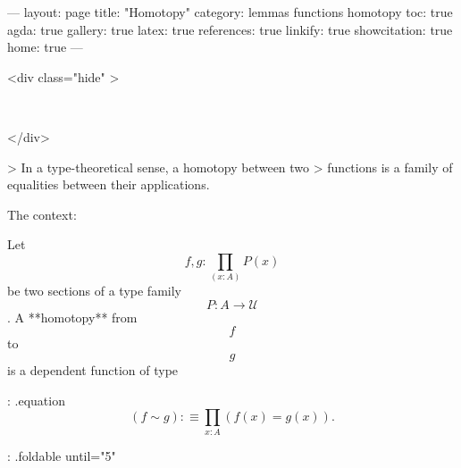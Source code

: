 ---
layout: page
title: "Homotopy"
category: lemmas functions homotopy
toc: true
agda: true
gallery: true
latex: true
references: true
linkify: true
showcitation: true
home: true
---

<div class="hide" >
\begin{code}%
\>[0]\AgdaSymbol{\{-\#}\AgdaSpace{}%
\AgdaSpace{}%
\AgdaSpace{}%
\AgdaSymbol{\#-\}}\<%
\\
\>[0]\AgdaSpace{}%
\AgdaSpace{}%
\<%
\end{code}
</div>

> In a type-theoretical sense, a homotopy between two
> functions is a family of equalities between their applications.

The context:
\begin{code}%
\>[0]\AgdaSpace{}%
\AgdaSpace{}%
\AgdaSymbol{\{}\AgdaSpace{}%
\AgdaSymbol{\}}\AgdaSpace{}%
\AgdaSymbol{\{}\AgdaSpace{}%
\AgdaSymbol{:}\AgdaSpace{}%
\AgdaSpace{}%
\AgdaSymbol{\}}\AgdaSpace{}%
\AgdaSymbol{\{}\AgdaSpace{}%
\AgdaSymbol{:}\AgdaSpace{}%
\AgdaSpace{}%
\AgdaSpace{}%
\AgdaSpace{}%
\AgdaSymbol{\}}\AgdaSpace{}%
\<%
\end{code}

Let $$f , g : \prod\limits_{(x:A)} P(x)$$ be two sections of a
type family $$P : A \to \mathcal{U}$$. A **homotopy** from $$f$$ to $$g$$
is a dependent function of type

{: .equation }
  $$ (f \sim g) :\equiv \prod\limits_{x : A} (f(x) = g(x)). $$

{: .foldable until="5"}
\begin{code}%
\>[0][@{}l@{\AgdaIndent{1}}]%
\>[2]\<%
\\
%
\>[2]\<%
\\
\>[2][@{}l@{\AgdaIndent{0}}]%
\>[4]\AgdaSymbol{:}\AgdaSpace{}%
\AgdaSymbol{(}\AgdaSpace{}%
\AgdaSpace{}%
\AgdaSymbol{:}\AgdaSpace{}%
\AgdaSpace{}%
\AgdaSpace{}%
\AgdaSymbol{)}\<%
\\
%
\>[4]\AgdaComment{---------------}\<%
\\
%
\>[4]\AgdaSpace{}%
\AgdaSpace{}%
\AgdaSymbol{(}\AgdaSpace{}%
\AgdaSpace{}%
\AgdaSymbol{)}\<%
\\
%
\\[\AgdaEmptyExtraSkip]%
%
\>[2]\AgdaSpace{}%
\AgdaSpace{}%
\AgdaSpace{}%
\AgdaSymbol{=}\AgdaSpace{}%
\AgdaSpace{}%
\AgdaSymbol{(}\AgdaSpace{}%
\AgdaSymbol{:}\AgdaSpace{}%
\AgdaSymbol{)}\AgdaSpace{}%
\AgdaSpace{}%
\AgdaSpace{}%
\AgdaSpace{}%
\AgdaOperator{\AgdaDatatype{==}}\AgdaSpace{}%
\AgdaSpace{}%
\<%
\end{code}

